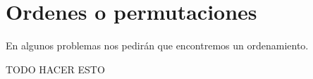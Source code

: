 \section{Ordenes o permutaciones}

En algunos problemas nos pedirán que encontremos un ordenamiento.

TODO HACER ESTO